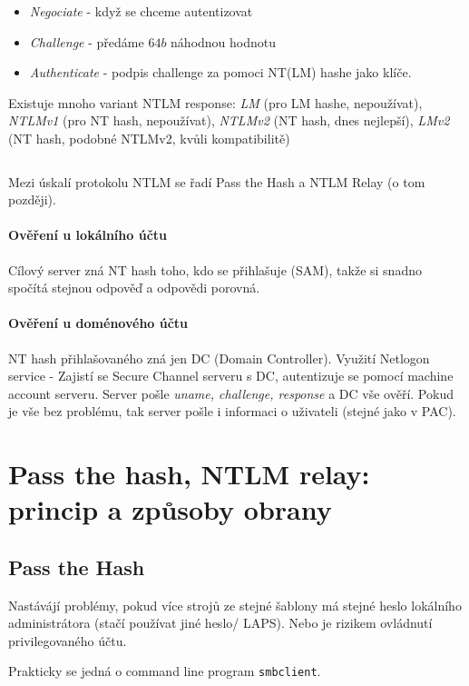 \documentclass[10pt,a4paper]{article}
\begin{document}
\begin{itemize}
	\item \textit{Negociate} - když se chceme autentizovat
	\item \textit{Challenge} - předáme $ 64b $ náhodnou hodnotu
	\item \textit{Authenticate} - podpis challenge za pomoci NT(LM) hashe jako klíče.
\end{itemize}
Existuje mnoho variant NTLM response: \textit{LM} (pro LM hashe, nepoužívat), \textit{NTLMv1} (pro NT hash, nepoužívat), \textit{NTLMv2} (NT hash, dnes nejlepší), \textit{LMv2} (NT hash, podobné NTLMv2, kvůli kompatibilitě)

$ $

Mezi úskalí protokolu NTLM se řadí Pass the Hash a NTLM Relay (o tom později).

\paragraph{Ověření u lokálního účtu}
Cílový server zná NT hash toho, kdo se přihlašuje (SAM), takže si snadno spočítá stejnou odpověď a odpovědi porovná.

\paragraph{Ověření u doménového účtu}
NT hash přihlašovaného zná jen DC (Domain Controller). 
Využití Netlogon service - Zajistí se Secure Channel serveru s DC, autentizuje se pomocí machine account serveru. 
Server pošle \textit{uname, challenge, response} a DC vše ověří. Pokud je vše bez problému, tak server pošle i informaci o uživateli (stejné jako v PAC).


\section{Pass the hash, NTLM relay: princip a způsoby obrany}

\subsection{Pass the Hash}

Nastávájí problémy, pokud více strojů ze stejné šablony má stejné heslo lokálního administrátora (stačí používat jiné heslo/ LAPS).
Nebo je rizikem ovládnutí privilegovaného účtu.

Prakticky se jedná o command line program \texttt{smbclient}.
\end{document}
